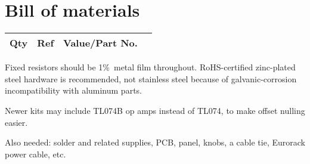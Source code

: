 
%
%
%
%
%
%

\onecolumn
\chapter{Bill of materials}\label{cha:bom}

{\centering
{}

\begin{longtable}{rp{1in}cp{3in}}
  \textbf{Qty} & \textbf{Ref} & \textbf{Value/Part No.} & \\ \hline \endhead

\end{longtable}\par}

Fixed resistors should be 1\%\ metal film throughout.
RoHS-certified zinc-plated steel hardware is recommended, not stainless
steel because of galvanic-corrosion incompatibility with aluminum parts.

Newer kits may include TL074B op amps instead of TL074, to make offset
nulling easier.

Also needed:  solder and related supplies, PCB, panel, knobs, a cable tie,
Eurorack power cable, etc.

\twocolumn
